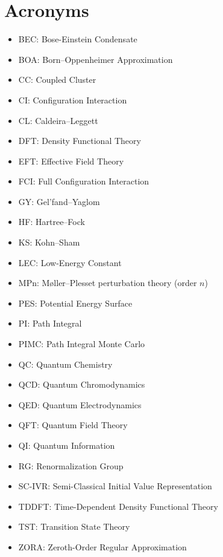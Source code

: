 \section{Acronyms}
\begin{multicols}{2}
\begin{itemize}
	\item BEC: Bose-Einstein Condensate
	\item BOA: Born--Oppenheimer Approximation
	\item CC: Coupled Cluster
	\item CI: Configuration Interaction
	\item CL: Caldeira--Leggett
	\item DFT: Density Functional Theory
	\item EFT: Effective Field Theory
	\item FCI: Full Configuration Interaction
	\item GY: Gel'fand--Yaglom
	\item HF: Hartree--Fock
	\item KS: Kohn--Sham
	\item LEC: Low-Energy Constant
	\item MPn: M\o{}ller--Plesset perturbation theory (order \(n\))
	\item PES: Potential Energy Surface
	\item PI: Path Integral
	\item PIMC: Path Integral Monte Carlo
	\item QC: Quantum Chemistry
	\item QCD: Quantum Chromodynamics
	\item QED: Quantum Electrodynamics
	\item QFT: Quantum Field Theory
	\item QI: Quantum Information
	\item RG: Renormalization Group
	\item SC-IVR: Semi-Classical Initial Value Representation
	\item TDDFT: Time-Dependent Density Functional Theory
	\item TST: Transition State Theory
	\item ZORA: Zeroth-Order Regular Approximation
\end{itemize}
\end{multicols}

